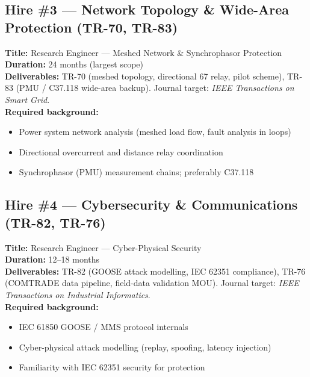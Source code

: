 \documentclass[11pt, a4paper]{article}
\begin{document}
\subsection{Hire \#3 — Network Topology \& Wide-Area Protection (TR-70, TR-83)}

\begin{infobox}
\textbf{Title:} Research Engineer — Meshed Network \& Synchrophasor Protection \\[4pt]
\textbf{Duration:} 24 months (largest scope) \\[4pt]
\textbf{Deliverables:} TR-70 (meshed topology, directional 67 relay, pilot scheme),
TR-83 (PMU / C37.118 wide-area backup).
Journal target: \textit{IEEE Transactions on Smart Grid}. \\[4pt]
\textbf{Required background:}
\begin{itemize}
  \item Power system network analysis (meshed load flow, fault analysis in loops)
  \item Directional overcurrent and distance relay coordination
  \item Synchrophasor (PMU) measurement chains; preferably C37.118
\end{itemize}
\end{infobox}

\subsection{Hire \#4 — Cybersecurity \& Communications (TR-82, TR-76)}

\begin{infobox}
\textbf{Title:} Research Engineer — Cyber-Physical Security \\[4pt]
\textbf{Duration:} 12--18 months \\[4pt]
\textbf{Deliverables:} TR-82 (GOOSE attack modelling, IEC 62351 compliance),
TR-76 (COMTRADE data pipeline, field-data validation MOU).
Journal target: \textit{IEEE Transactions on Industrial Informatics}. \\[4pt]
\textbf{Required background:}
\begin{itemize}
  \item IEC 61850 GOOSE / MMS protocol internals
  \item Cyber-physical attack modelling (replay, spoofing, latency injection)
  \item Familiarity with IEC 62351 security for protection
\end{itemize}
\end{infobox}
\end{document}
